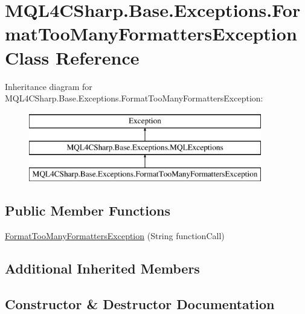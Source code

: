 \hypertarget{class_m_q_l4_c_sharp_1_1_base_1_1_exceptions_1_1_format_too_many_formatters_exception}{}\section{M\+Q\+L4\+C\+Sharp.\+Base.\+Exceptions.\+Format\+Too\+Many\+Formatters\+Exception Class Reference}
\label{class_m_q_l4_c_sharp_1_1_base_1_1_exceptions_1_1_format_too_many_formatters_exception}
Inheritance diagram for M\+Q\+L4\+C\+Sharp.\+Base.\+Exceptions.\+Format\+Too\+Many\+Formatters\+Exception\+:\begin{figure}[H]
\begin{center}
\leavevmode
\includegraphics[height=3.000000cm]{class_m_q_l4_c_sharp_1_1_base_1_1_exceptions_1_1_format_too_many_formatters_exception}
\end{center}
\end{figure}
\subsection*{Public Member Functions}
\begin{DoxyCompactItemize}
\item 
\hyperlink{class_m_q_l4_c_sharp_1_1_base_1_1_exceptions_1_1_format_too_many_formatters_exception_a5ab3aa81d6ee351f95d2c89c02367eb2}{Format\+Too\+Many\+Formatters\+Exception} (String function\+Call)
\end{DoxyCompactItemize}
\subsection*{Additional Inherited Members}


\subsection{Constructor \& Destructor Documentation}
